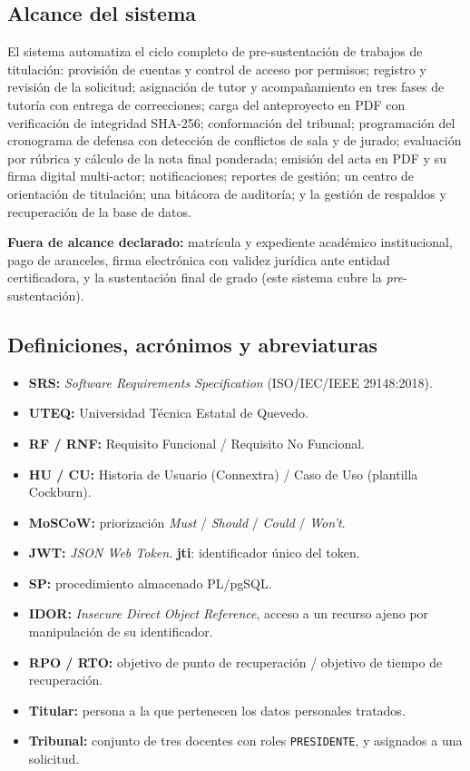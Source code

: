 \documentclass[11pt,a4paper]{article}
\DeclareRobustCommand{\cd}[1]{\texttt{\protect\seqsplit{#1}}}
\begin{document}
\subsection{Alcance del sistema}
El sistema automatiza el ciclo completo de pre-sustentación de trabajos de titulación:
provisión de cuentas y control de acceso por permisos; registro y revisión de la solicitud;
asignación de tutor y acompañamiento en tres fases de tutoría con entrega de correcciones;
carga del anteproyecto en PDF con verificación de integridad SHA-256; conformación del
tribunal; programación del cronograma de defensa con detección de conflictos de sala y de
jurado; evaluación por rúbrica y cálculo de la nota final ponderada; emisión del acta en PDF
y su firma digital multi-actor; notificaciones; reportes de gestión; un centro de orientación
de titulación; una bitácora de auditoría; y la gestión de respaldos y recuperación de la base
de datos.

\textbf{Fuera de alcance declarado:} matrícula y expediente académico institucional, pago de
aranceles, firma electrónica con validez jurídica ante entidad certificadora, y la sustentación
final de grado (este sistema cubre la \emph{pre}-sustentación).

\subsection{Definiciones, acrónimos y abreviaturas}
\begin{itemize}
    \item \textbf{SRS:} \emph{Software Requirements Specification} (ISO/IEC/IEEE 29148:2018).
    \item \textbf{UTEQ:} Universidad Técnica Estatal de Quevedo.
    \item \textbf{RF / RNF:} Requisito Funcional / Requisito No Funcional.
    \item \textbf{HU / CU:} Historia de Usuario (Connextra) / Caso de Uso (plantilla Cockburn).
    \item \textbf{MoSCoW:} priorización \emph{Must} / \emph{Should} / \emph{Could} / \emph{Won't}.
    \item \textbf{JWT:} \emph{JSON Web Token}. \textbf{jti}: identificador único del token.
    \item \textbf{SP:} procedimiento almacenado PL/pgSQL.
    \item \textbf{IDOR:} \emph{Insecure Direct Object Reference}, acceso a un recurso ajeno por
          manipulación de su identificador.
    \item \textbf{RPO / RTO:} objetivo de punto de recuperación / objetivo de tiempo de
          recuperación.
    \item \textbf{Titular:} persona a la que pertenecen los datos personales tratados.
    \item \textbf{Tribunal:} conjunto de tres docentes con roles \texttt{PRESIDENTE},
          \cd{VOCAL\_1} y \cd{VOCAL\_2} asignados a una solicitud.
\end{itemize}
\end{document}
